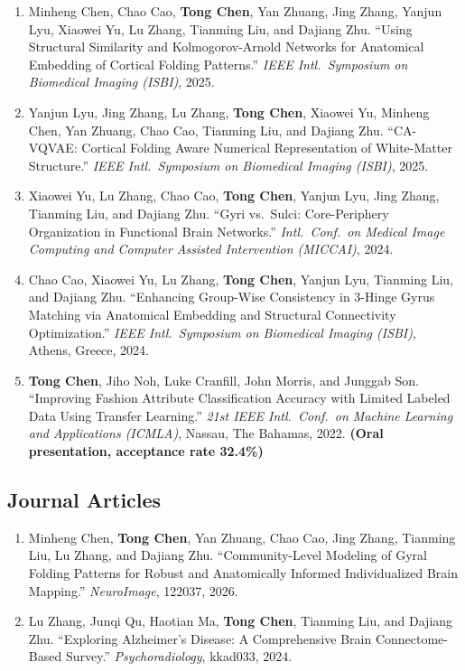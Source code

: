 \begin{enumerate}
  \item Minheng Chen, Chao Cao, \textbf{Tong Chen}, Yan Zhuang, Jing Zhang, Yanjun Lyu,
        Xiaowei Yu, Lu Zhang, Tianming Liu, and Dajiang Zhu. ``Using Structural Similarity
        and Kolmogorov-Arnold Networks for Anatomical Embedding of Cortical Folding
        Patterns.'' \textit{IEEE Intl.\ Symposium on Biomedical Imaging (ISBI)}, 2025.
  \item Yanjun Lyu, Jing Zhang, Lu Zhang, \textbf{Tong Chen}, Xiaowei Yu, Minheng Chen,
        Yan Zhuang, Chao Cao, Tianming Liu, and Dajiang Zhu. ``CA-VQVAE: Cortical Folding
        Aware Numerical Representation of White-Matter Structure.'' \textit{IEEE Intl.\
        Symposium on Biomedical Imaging (ISBI)}, 2025.
  \item Xiaowei Yu, Lu Zhang, Chao Cao, \textbf{Tong Chen}, Yanjun Lyu, Jing Zhang,
        Tianming Liu, and Dajiang Zhu. ``Gyri vs.\ Sulci: Core-Periphery Organization in
        Functional Brain Networks.'' \textit{Intl.\ Conf.\ on Medical Image Computing and
        Computer Assisted Intervention (MICCAI)}, 2024.
  \item Chao Cao, Xiaowei Yu, Lu Zhang, \textbf{Tong Chen}, Yanjun Lyu, Tianming Liu, and
        Dajiang Zhu. ``Enhancing Group-Wise Consistency in 3-Hinge Gyrus Matching via
        Anatomical Embedding and Structural Connectivity Optimization.'' \textit{IEEE Intl.\
        Symposium on Biomedical Imaging (ISBI)}, Athens, Greece, 2024.
  \item \textbf{Tong Chen}, Jiho Noh, Luke Cranfill, John Morris, and Junggab Son.
        ``Improving Fashion Attribute Classification Accuracy with Limited Labeled Data
        Using Transfer Learning.'' \textit{21st IEEE Intl.\ Conf.\ on Machine Learning and
        Applications (ICMLA)}, Nassau, The Bahamas, 2022. \textbf{(Oral presentation,
        acceptance rate 32.4\%)}
\end{enumerate}

\subsection*{Journal Articles}
\begin{enumerate}
  \item Minheng Chen, \textbf{Tong Chen}, Yan Zhuang, Chao Cao, Jing Zhang, Tianming Liu,
        Lu Zhang, and Dajiang Zhu. ``Community-Level Modeling of Gyral Folding Patterns for
        Robust and Anatomically Informed Individualized Brain Mapping.'' \textit{NeuroImage},
        122037, 2026.
  \item Lu Zhang, Junqi Qu, Haotian Ma, \textbf{Tong Chen}, Tianming Liu, and Dajiang Zhu.
        ``Exploring Alzheimer's Disease: A Comprehensive Brain Connectome-Based Survey.''
        \textit{Psychoradiology}, kkad033, 2024.
\end{enumerate}


